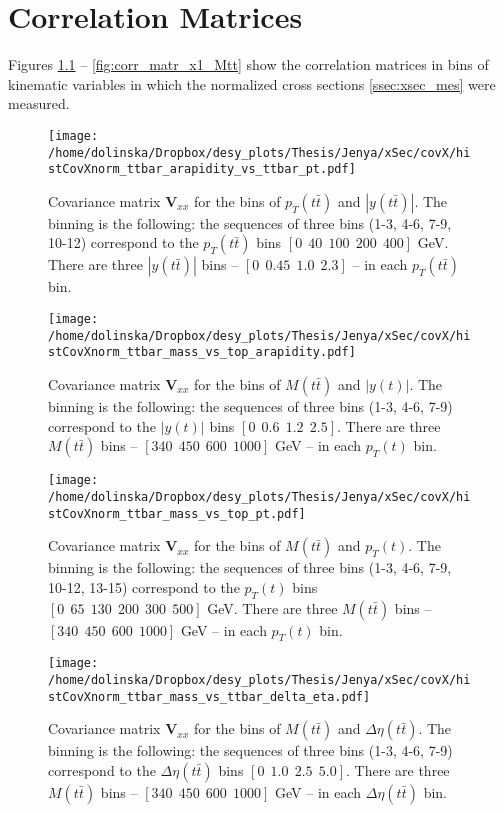\chapter{Correlation Matrices}\label{appendix:corr_m}

Figures \ref{fig:corr_matr_pttt_ytt} -- \ref{fig:corr_matr_x1_Mtt} show the correlation matrices in bins of kinematic variables in which the normalized cross sections \ref{ssec:xsec_mes}
were measured.

\begin{figure}[h]
  \centering
  \texttt{[image: /home/dolinska/Dropbox/desy\_plots/Thesis/Jenya/xSec/covX/histCovXnorm\_ttbar\_arapidity\_vs\_ttbar\_pt.pdf]}
  \caption{Covariance matrix $\mathbf{V}_{xx}$ for the bins of $p_{T}(t\bar{t})$ and $|y(t\bar{t})|$. The binning is the following:
  the sequences of three bins (1-3, 4-6, 7-9, 10-12) correspond to the $p_{T}(t\bar{t})$ bins $[0\:\:40\:\:100\:\:200\:\:400]$ GeV.
          There are three $|y(t\bar{t})|$ bins -- $[0\:\:0.45\:\:1.0\:\:2.3]$ -- in each $p_{T}(t\bar{t})$ bin.}
  \label{fig:corr_matr_pttt_ytt}
\end{figure}

\begin{figure}[p]
  \centering
  \texttt{[image: /home/dolinska/Dropbox/desy\_plots/Thesis/Jenya/xSec/covX/histCovXnorm\_ttbar\_mass\_vs\_top\_arapidity.pdf]}
  \caption{Covariance matrix $\mathbf{V}_{xx}$ for the bins of $M(t\bar{t})$ and $|y(t)|$. The binning is the following:
  the sequences of three bins (1-3, 4-6, 7-9) correspond to the $|y(t)|$ bins $[0\:\:0.6\:\:1.2\:\:2.5]$.
          There are three $M(t\bar{t})$ bins -- $[340\:\:450\:\:600\:\:1000]$ GeV -- in each $p_{T}(t)$ bin.}
  \label{fig:corr_matr_yt_Mtt}
\end{figure}

\begin{figure}[p]
  \centering
  \texttt{[image: /home/dolinska/Dropbox/desy\_plots/Thesis/Jenya/xSec/covX/histCovXnorm\_ttbar\_mass\_vs\_top\_pt.pdf]}
  \caption{Covariance matrix $\mathbf{V}_{xx}$ for the bins of $M(t\bar{t})$ and $p_{T}(t)$. The binning is the following:
  the sequences of three bins (1-3, 4-6, 7-9, 10-12, 13-15) correspond to the $p_{T}(t)$ bins $[0\:\:65\:\:130\:\:200\:\:300\:\:500]$ GeV.
          There are three $M(t\bar{t})$ bins -- $[340\:\:450\:\:600\:\:1000]$ GeV -- in each $p_{T}(t)$ bin.}
  \label{fig:corr_matr_Mtt_pt}
\end{figure}

\begin{figure}[p]
  \centering
  \texttt{[image: /home/dolinska/Dropbox/desy\_plots/Thesis/Jenya/xSec/covX/histCovXnorm\_ttbar\_mass\_vs\_ttbar\_delta\_eta.pdf]}
  \caption{Covariance matrix $\mathbf{V}_{xx}$ for the bins of $M(t\bar{t})$ and $\Delta\eta(t\bar{t})$. The binning is the following:
  the sequences of three bins (1-3, 4-6, 7-9) correspond to the $\Delta\eta(t\bar{t})$ bins $[0\:\:1.0\:\:2.5\:\:5.0]$.
          There are three $M(t\bar{t})$ bins -- $[340\:\:450\:\:600\:\:1000]$ GeV -- in each $\Delta\eta(t\bar{t})$ bin.}
  \label{fig:corr_matr_eta_Mtt}
\end{figure}

